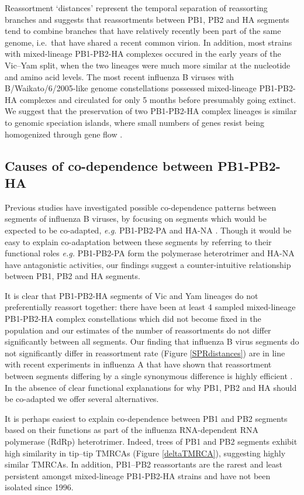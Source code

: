 \documentclass[11pt,oneside,letterpaper]{article}
\begin{document}
Reassortment `distances' represent the temporal separation of reassorting branches and suggests that reassortments between PB1, PB2 and HA segments tend to combine branches that have relatively recently been part of the same genome, i.e.\ that have shared a recent common virion.
In addition, most strains with mixed-lineage PB1-PB2-HA complexes occured in the early years of the Vic--Yam split, when the two lineages were much more similar at the nucleotide and amino acid levels.
The most recent influenza B viruses with B/Waikato/6/2005-like genome constellations possessed mixed-lineage PB1-PB2-HA complexes and circulated for only 5 months before presumably going extinct.
We suggest that the preservation of two PB1-PB2-HA complex lineages is similar to genomic speciation islands, where small numbers of genes resist being homogenized through gene flow \cite{turner2005}.

\subsection*{Causes of co-dependence between PB1-PB2-HA}
Previous studies have investigated possible co-dependence patterns between segments of influenza B viruses, by focusing on segments which would be expected to be co-adapted, \textit{e.g.} PB1-PB2-PA and HA-NA \cite{mccullers2004}.
Though it would be easy to explain co-adaptation between these segments by referring to their functional roles \textit{e.g.} PB1-PB2-PA form the polymerase heterotrimer and HA-NA have antagonistic activities, our findings suggest a counter-intuitive relationship between PB1, PB2 and HA segments.

It is clear that PB1-PB2-HA segments of Vic and Yam lineages do not preferentially reassort together: there have been at least 4 sampled mixed-lineage PB1-PB2-HA complex constellations which did not become fixed in the population and our estimates of the number of reassortments do not differ significantly between all segments.
Our finding that influenza B virus segments do not significantly differ in reassortment rate (Figure \ref{SPRdistances}) are in line with recent experiments in influenza A that have shown that reassortment between segments differing by a single synonymous difference is highly efficient \cite{marshall2013}.
In the absence of clear functional explanations for why PB1, PB2 and HA should be co-adapted we offer several alternatives.

It is perhaps easiest to explain co-dependence between PB1 and PB2 segments based on their functions as part of the influenza RNA-dependent RNA polymerase (RdRp) heterotrimer.
Indeed, trees of PB1 and PB2 segments exhibit high similarity in tip--tip TMRCAs (Figure \ref{deltaTMRCA}), suggesting highly similar TMRCAs.
In addition, PB1--PB2 reassortants are the rarest and least persistent amongst mixed-lineage PB1-PB2-HA strains and have not been isolated since 1996.
\end{document}
